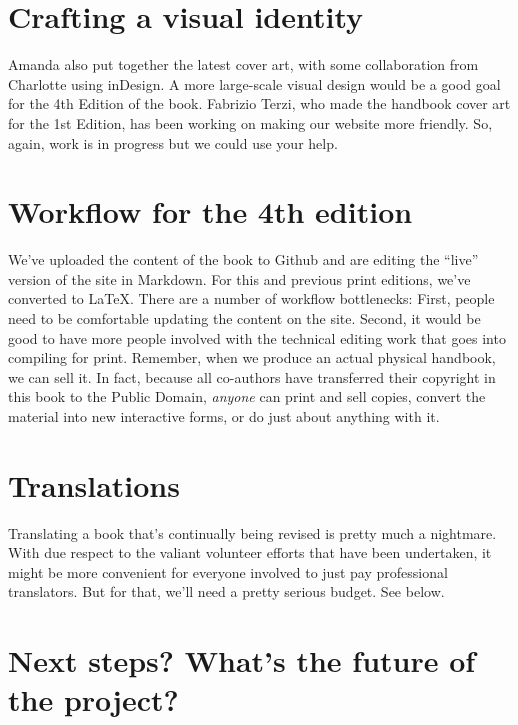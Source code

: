 \section*{Crafting a visual identity}\label{crafting-a-visual-identity}

Amanda also put together the latest cover art, with some collaboration
from Charlotte using inDesign.  A more large-scale visual design would be
a good goal for the 4th Edition of the book. Fabrizio Terzi, who made
the handbook cover art for the 1st Edition, has been working on
making our website more friendly.  So, again, work is in progress but we
could use your help.

\section*{Workflow for the 4th
edition}\label{workflow-for-the-4th-edition}

We've uploaded the content of the book to Github and are editing the
``live'' version of the site in Markdown. For this and previous print editions,
we've converted to LaTeX. There are a number of workflow bottlenecks:
First, people need to be comfortable updating the content on the site.
Second, it would be good to have more people involved with the technical
editing work that goes into compiling for print. Remember, when we
produce an actual physical handbook, we can sell it. In fact, because
all co-authors have transferred their copyright in this book to the
Public Domain, \emph{anyone} can print and sell copies, convert the
material into new interactive forms, or do just about anything with it.

\section*{Translations}\label{translations}

Translating a book that's continually being revised is pretty much a
nightmare. With due respect to the valiant volunteer efforts that have
been undertaken, it might be more convenient for everyone involved to
just pay professional translators. But for that, we'll need a pretty
serious budget. See below.

\section*{Next steps? What's the future of the
project?}\label{next-steps-whats-the-future-of-the-project}

